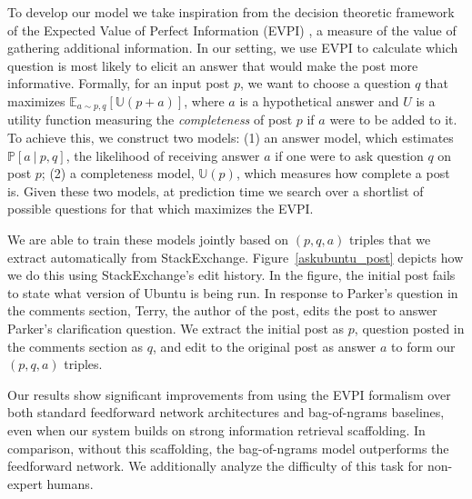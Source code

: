 \documentclass[11pt,a4paper]{article}
\newcommand{\U}{\mathbb{U}}
\begin{document}
To develop our model we take inspiration from the decision theoretic framework of the Expected Value of Perfect Information (EVPI) \cite{avriel1970value}, a measure of the value of gathering additional information. In our setting, we use EVPI to calculate which question is most likely to elicit an answer that would make the post more informative.
Formally, for an input post $p$, we want to choose a question $q$ that maximizes $\mathbb{E}_{a \sim p,q}[\U(p+a)]$, where $a$ is a hypothetical answer and $U$ is a utility function measuring the \emph{completeness} of post $p$ if $a$ were to be added to it.
To achieve this, we construct two models:
(1) an answer model, which estimates $\mathbb{P}[a~|~p,q]$, the likelihood of receiving answer $a$ if one were to ask question $q$ on post $p$;
(2) a completeness model, $\U(p)$, which measures how complete a post is.
Given these two models, at prediction time we search over a shortlist of possible questions for that which maximizes the EVPI.

We are able to train these models jointly based on $(p,q,a)$ triples that we extract automatically from StackExchange.
Figure~\ref{askubuntu_post} depicts how we do this using StackExchange's edit history.  In the figure, the initial post fails to state what version of Ubuntu is being run. In response to Parker's question in the comments section, Terry, the author of the post, edits the post to answer Parker's clarification question. We extract the initial post as $p$, question posted in the comments section as $q$, and edit to the original post as answer $a$ to form our $(p,q,a)$ triples. 

Our results show significant improvements from using the EVPI formalism over both standard feedforward network architectures and bag-of-ngrams baselines, even when our system builds on strong information retrieval scaffolding. In comparison, without this scaffolding, the bag-of-ngrams model outperforms the feedforward network. We additionally analyze the difficulty of this task for non-expert humans. 
\end{document}
